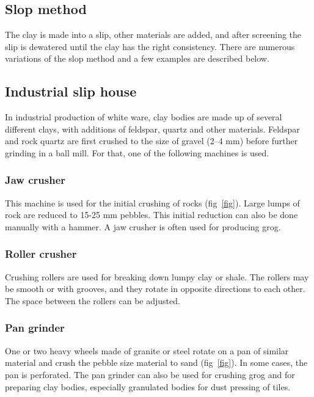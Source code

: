 \subsection{Slop method}
The clay is made into a slip, other materials are added, and after screening 
the slip is dewatered until the clay has the right consistency. There are 
numerous variations of the slop method and a few examples are described below.
\subsection{Industrial slip house}
In industrial production of white ware, clay bodies are made up of several 
different clays, with additions of feldspar, quartz and other materials. 
Feldspar and rock quartz are first crushed to the size of gravel (2--4 mm) 
before further grinding in a ball mill. For that, one of the following machines 
is used.
\subsubsection{Jaw crusher}
This machine is used for the initial crushing of rocks (fig~\ref{fig}). Large 
lumps of rock are reduced to 15-25 mm pebbles. This initial reduction can also 
be done manually with a hammer. A jaw crusher is often used for producing grog.
\subsubsection{Roller crusher}
Crushing rollers are used for breaking down lumpy clay or shale. The rollers 
may be smooth or with grooves, and they rotate in opposite directions to each 
other. The space between the rollers can be adjusted.
\subsubsection{Pan grinder}
One or two heavy wheels made of granite or steel rotate on a pan of similar 
material and crush the pebble size material to sand (fig~\ref{fig}). In some 
cases, the pan is perforated. The pan grinder can also be used for crushing 
grog and for preparing clay bodies, especially granulated bodies for dust 
pressing of tiles.
